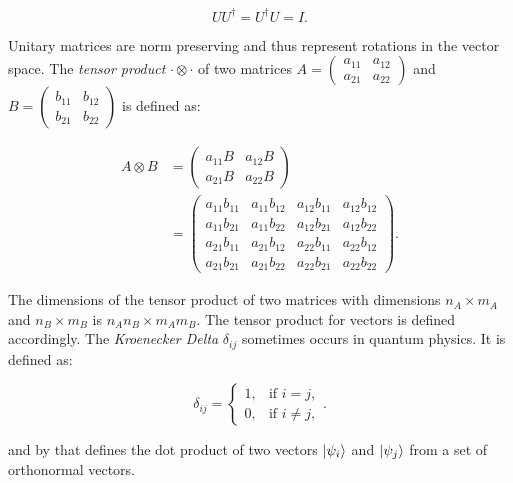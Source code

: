 \begin{equation}
   U U^{\dagger} = U^{\dagger}U = I.
\end{equation}

Unitary matrices are norm preserving and thus represent rotations in the vector space.
The \textit{tensor product} $\cdot \otimes \cdot$ of two matrices $A=\begin{pmatrix}
   a_{11} & a_{12} \\ a_{21} & a_{22}
\end{pmatrix}$ and $B= \begin{pmatrix}
   b_{11} & b_{12} \\ b_{21} & b_22
\end{pmatrix}$ is defined as:

\begin{align}
   A \otimes B &= \begin{pmatrix}
      a_{11} B & a_{12} B \\ a_{21} B & a_{22} B
   \end{pmatrix} \\
   &= \begin{pmatrix}
      a_{11} b_{11} & a_{11} b_{12} & a_{12} b_{11} & a_{12} b_{12} \\
      a_{11} b_{21} & a_{11} b_{22} & a_{12} b_{21} & a_{12} b_{22} \\ 
      a_{21} b_{11} & a_{21} b_{12} & a_{22} b_{11} & a_{22} b_{12} \\
      a_{21} b_{21} & a_{21} b_{22} & a_{22} b_{21} & a_{22} b_{22}
   \end{pmatrix}.
\end{align}

The dimensions of the tensor product of two matrices with dimensions $n_A \times m_A$ and $n_B \times m_B$ 
is $n_An_B \times m_Am_B$. The tensor product for vectors is defined accordingly.
The \textit{Kroenecker Delta} $\delta_{ij}$ sometimes occurs in quantum physics. It is defined as:

\begin{equation}
   \delta_{ij} =
    \begin{cases}
            1, &         \text{if } i=j,\\
            0, &         \text{if } i\neq j,
    \end{cases}.
\end{equation}

and by that defines the dot product of two vectors $\Ket{\psi_i}$ and $\Ket{\psi_j}$ from 
a set of orthonormal vectors.



